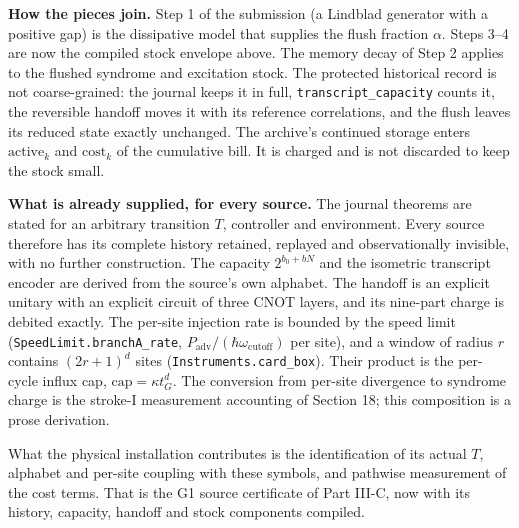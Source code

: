 \documentclass[
]{article}
\begin{document}
\textbf{How the pieces join.} Step 1 of the submission (a Lindblad
generator with a positive gap) is the dissipative model that supplies
the flush fraction \(\alpha\). Steps 3--4 are now the compiled stock
envelope above. The memory decay of Step 2 applies to the flushed
syndrome and excitation stock. The protected historical record is not
coarse-grained: the journal keeps it in full,
\texttt{t\allowbreak{}r\allowbreak{}a\allowbreak{}n\allowbreak{}s\allowbreak{}c\allowbreak{}r\allowbreak{}i\allowbreak{}p\allowbreak{}t\allowbreak{}\_\allowbreak{}c\allowbreak{}a\allowbreak{}p\allowbreak{}a\allowbreak{}c\allowbreak{}i\allowbreak{}t\allowbreak{}y}
counts it, the reversible handoff moves it with its reference
correlations, and the flush leaves its reduced state exactly unchanged.
The archive's continued storage enters \(\mathrm{active}_k\) and
\(\mathrm{cost}_k\) of the cumulative bill. It is charged and is not
discarded to keep the stock small.

\textbf{What is already supplied, for every source.} The journal
theorems are stated for an arbitrary transition \(T\), controller and
environment. Every source therefore has its complete history retained,
replayed and observationally invisible, with no further construction.
The capacity \(2^{b_0+bN}\) and the isometric transcript encoder are
derived from the source's own alphabet. The handoff is an explicit
unitary with an explicit circuit of three CNOT layers, and its nine-part
charge is debited exactly. The per-site injection rate is bounded by the
speed limit
(\texttt{S\allowbreak{}p\allowbreak{}e\allowbreak{}e\allowbreak{}d\allowbreak{}L\allowbreak{}i\allowbreak{}m\allowbreak{}i\allowbreak{}t\allowbreak{}.\allowbreak{}b\allowbreak{}r\allowbreak{}a\allowbreak{}n\allowbreak{}c\allowbreak{}h\allowbreak{}A\allowbreak{}\_\allowbreak{}r\allowbreak{}a\allowbreak{}t\allowbreak{}e},
\(P_{\mathrm{adv}}/(\hbar\omega_{\mathrm{cutoff}})\) per site), and a
window of radius \(r\) contains \((2r+1)^{d}\) sites
(\texttt{I\allowbreak{}n\allowbreak{}s\allowbreak{}t\allowbreak{}r\allowbreak{}u\allowbreak{}m\allowbreak{}e\allowbreak{}n\allowbreak{}t\allowbreak{}s\allowbreak{}.\allowbreak{}c\allowbreak{}a\allowbreak{}r\allowbreak{}d\allowbreak{}\_\allowbreak{}b\allowbreak{}o\allowbreak{}x}).
Their product is the per-cycle influx cap,
\(\mathrm{cap}=\kappa t_G^{d}\). The conversion from per-site divergence
to syndrome charge is the stroke-I measurement accounting of Section 18;
this composition is a prose derivation.

What the physical installation contributes is the identification of its
actual \(T\), alphabet and per-site coupling with these symbols, and
pathwise measurement of the cost terms. That is the G1 source
certificate of Part III-C, now with its history, capacity, handoff and
stock components compiled.
\end{document}

